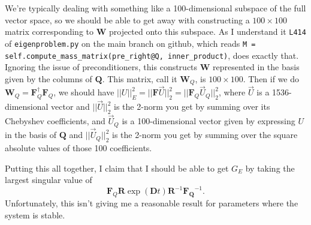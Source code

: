 \documentclass[aps,pop,preprint]{revtex4}
\begin{document}
We're typically dealing with something like a 100-dimensional subspace of the full vector space, so we should be able to get away with constructing a $100 \times 100$ matrix corresponding to $\mathbf{W}$ projected onto this subspace. 
As I understand it \texttt{L414} of \texttt{eigenproblem.py} on the main branch on github, which reads \texttt{M = self.compute\_mass\_matrix(pre\_right@Q, inner\_product)}, does exactly that. 
Ignoring the issue of preconditioners, this constructs $\mathbf{W}$ represented in the basis given by the columns of $\mathbf{Q}$. 
This matrix, call it $\mathbf{W}_Q$, is $100 \times 100$. 
Then if we do $\mathbf{W}_Q = \mathbf{F}^\dagger_Q \mathbf{F}_Q$, we should have $||U||_E^2 = ||\mathbf{F} \vec{U}||_2^2 = ||\mathbf{F}_Q \vec{U}_Q||_2^2$, where $\vec{U}$ is a 1536-dimensional vector and $||\vec{U}||_2^2$ is the 2-norm you get by summing over its Chebyshev coefficients, and $\vec{U}_Q$ is a 100-dimensional vector given by expressing $U$ in the basis of $\mathbf{Q}$ and $||\vec{U}_Q||_2^2$ is the 2-norm you get by summing over the square absolute values of those 100 coefficients.

Putting this all together, I claim that I should be able to get $G_E$ by taking the largest singular value of
\begin{equation}
\mathbf{F}_Q \mathbf{R} \exp(\mathbf{D} t) \mathbf{R}^{-1} \mathbf{F_Q}^{-1}.
\end{equation}
Unfortunately, this isn't giving me a reasonable result for parameters where the system is stable.
\end{document}
